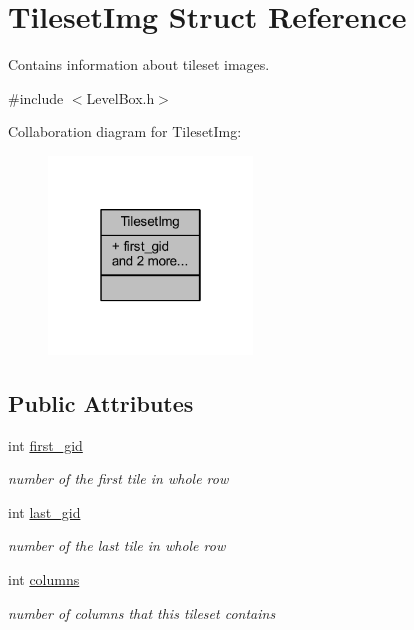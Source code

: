 \hypertarget{struct_tileset_img}{}\section{Tileset\+Img Struct Reference}
\label{struct_tileset_img}


Contains information about tileset images.  




{\ttfamily \#include $<$Level\+Box.\+h$>$}



Collaboration diagram for Tileset\+Img\+:
\nopagebreak
\begin{figure}[H]
\begin{center}
\leavevmode
\includegraphics[width=154pt]{struct_tileset_img__coll__graph}
\end{center}
\end{figure}
\subsection*{Public Attributes}
\begin{DoxyCompactItemize}
\item 
\mbox{\label{struct_tileset_img_a5cb5a67d6afd202da1aafd53e509167c}} 
int \hyperlink{struct_tileset_img_a5cb5a67d6afd202da1aafd53e509167c}{first\+\_\+gid}
\begin{DoxyCompactList}\small\item\em number of the first tile in whole row \end{DoxyCompactList}\item 
\mbox{\label{struct_tileset_img_a2cf02afb15fac885b30fd7d4d56374c1}} 
int \hyperlink{struct_tileset_img_a2cf02afb15fac885b30fd7d4d56374c1}{last\+\_\+gid}
\begin{DoxyCompactList}\small\item\em number of the last tile in whole row \end{DoxyCompactList}\item 
\mbox{\label{struct_tileset_img_a9bd1b96e5ce27e6cb778d9fb96138883}} 
int \hyperlink{struct_tileset_img_a9bd1b96e5ce27e6cb778d9fb96138883}{columns}
\begin{DoxyCompactList}\small\item\em number of columns that this tileset contains \end{DoxyCompactList}\end{DoxyCompactItemize}


